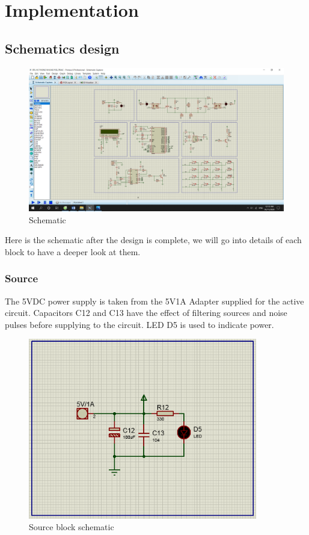 \documentclass[a4paper]{article}
\begin{document}
\newpage
\section{Implementation}\label{eval}
\subsection{Schematics design}
\begin{figure}[h!]
\centering
\includegraphics[width=17cm]{images/SCHE.PNG}
\caption*{Schematic}
\end{figure}
\noindent
Here is the schematic after the design is complete, we will go into details of each block to have a deeper look at them.
\subsubsection{Source}
The 5VDC power supply is taken from the 5V1A Adapter supplied for the active circuit. Capacitors C12 and C13 have the effect of filtering sources and noise pulses before supplying to the circuit. LED D5 is used to indicate power.
\begin{figure}[h!]
\centering
\includegraphics[width=10cm]{images/source.png}
\caption*{Source block schematic}
\end{figure}
\end{document}
